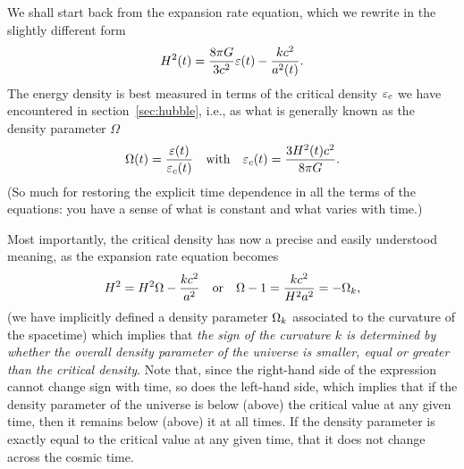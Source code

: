We shall start back from the expansion rate equation, which we rewrite in the slightly
different form
\begin{align*}
  H^2(t) = \frac{8\pi G}{3c^2} \varepsilon(t) - \frac{kc^2}{a^2(t)}.
\end{align*}
The energy density is best measured in terms of the critical density $\varepsilon_c$
we have encountered in section~\ref{sec:hubble}, i.e., as what is generally
known as the density parameter $\Omega$
\begin{align}
  \Omega(t) = \frac{\varepsilon(t)}{\varepsilon_c(t)} \quad\text{with}\quad
  \varepsilon_c(t) = \frac{3H^2(t) c^2}{8\pi G}.
\end{align}
(So much for restoring the explicit time dependence in all the terms of the equations:
you have a sense of what is constant and what varies with time.)

Most importantly, the critical density has now a precise and easily understood meaning,
as the expansion rate equation becomes
\begin{align}
  H^2 = H^2 \Omega - \frac{k c^2}{a^2}\quad\text{or}\quad
  \Omega - 1 = \frac{k c^2}{H^2 a^2} = -\Omega_k,
\end{align}
(we have implicitly defined a density parameter $\Omega_k$ associated to the curvature
of the spacetime) which implies that \emph{the sign of the curvature $k$ is determined
by whether the overall density parameter of the universe is smaller, equal or greater
than the critical density}. Note that, since the right-hand side of the expression cannot
change sign with time, so does the left-hand side, which
implies that if the density parameter of the universe is below (above) the critical
value at any given time, then it remains below (above) it at all times. If the
density parameter is exactly equal to the critical value at any given time, that
it does not change across the cosmic time.

